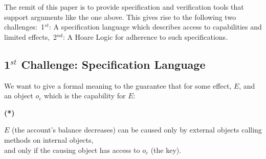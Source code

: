  \noindent
The remit of this paper is to provide specification and verification tools that support arguments like the one above.
This gives rise to the following two challenges:\  1$^{st}$:  A specification language which describes access to capabilities and limited effects,\ 
2$^{nd}$: A  Hoare Logic for adherence to such specifications.




 
 
\subsection{1$^{st}$ Challenge: Specification Language} 

We want to give a formal meaning to the guarantee that for some effect, $E$, and an object $o_c$ which is the capability for $E$:

\vspace{.1cm}

  \begin{minipage}{.05\textwidth}
   \textbf{(*)}
\end{minipage}
\hfill
\begin{minipage}{.95\textwidth}
\begin{flushleft}
$E$  (\eg the account's balance decreases)  can be caused only  by external objects calling methods on internal objects, \\
and only if the causing object has access  to $o_c$ (\eg the key).
\end{flushleft}
\end{minipage}

\vspace{.1cm}

